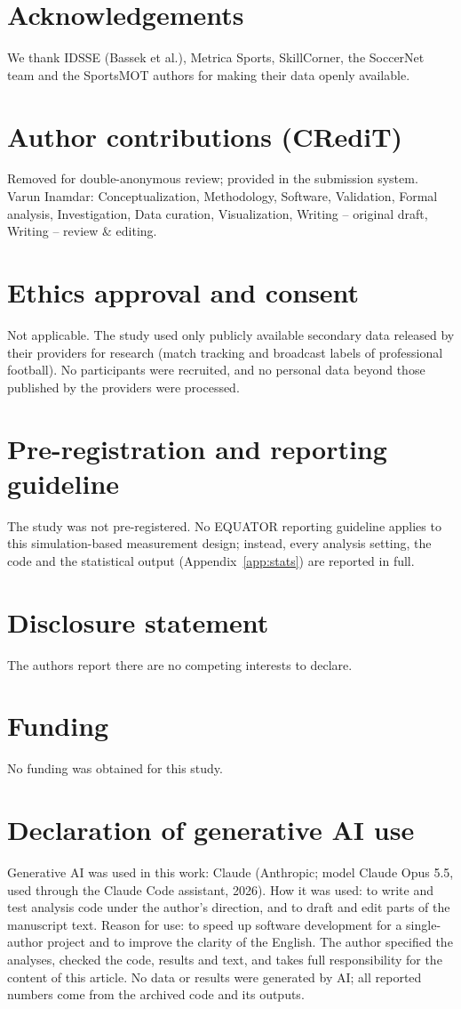 \documentclass[]{interact}
\begin{document}
\section*{Acknowledgements}
We thank IDSSE (Bassek et al.), Metrica Sports, SkillCorner, the SoccerNet team and the SportsMOT authors for making
their data openly available.

\section*{Author contributions (CRediT)}
\ifanonymous
Removed for double-anonymous review; provided in the submission system.
\else
Varun Inamdar: Conceptualization, Methodology, Software, Validation, Formal analysis, Investigation, Data curation,
Visualization, Writing -- original draft, Writing -- review \& editing.
\fi

\section*{Ethics approval and consent}
Not applicable. The study used only publicly available secondary data released by their providers for research
(match tracking and broadcast labels of professional football). No participants were recruited, and no personal data
beyond those published by the providers were processed.

\section*{Pre-registration and reporting guideline}
The study was not pre-registered. No EQUATOR reporting guideline applies to this simulation-based measurement design;
instead, every analysis setting, the code and the statistical output (Appendix~\ref{app:stats}) are reported in full.

\section*{Disclosure statement}
The authors report there are no competing interests to declare.

\section*{Funding}
No funding was obtained for this study.

\section*{Declaration of generative AI use}
Generative AI was used in this work: Claude (Anthropic; model Claude Opus 5.5, used through the Claude Code
assistant, 2026). How it was used: to write and test analysis code under the author's direction, and to draft and
edit parts of the manuscript text. Reason for use: to speed up software development for a single-author project and
to improve the clarity of the English. The author specified the analyses, checked the code, results and text, and
takes full responsibility for the content of this article. No data or results were generated by AI; all reported
numbers come from the archived code and its outputs.
\end{document}

